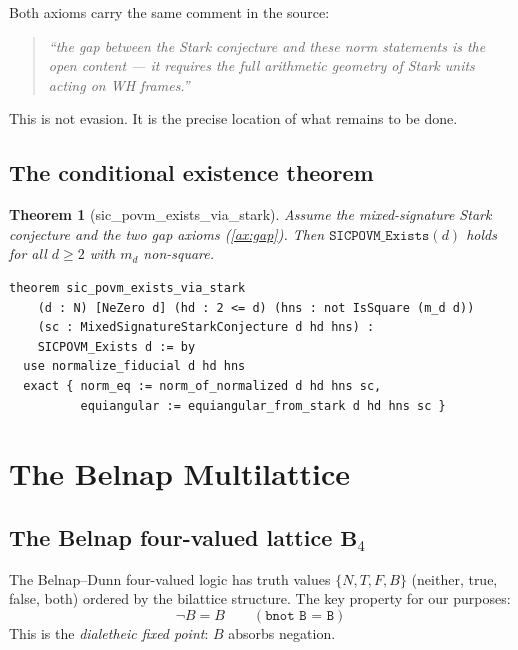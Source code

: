 \documentclass[12pt,a4paper]{article}
\newtheorem{theorem}{Theorem}[section]
\newcommand{\BFour}{\mathbf{B}_4}
\begin{document}
Both axioms carry the same comment in the source:
\begin{quotation}
\noindent\textit{``the gap between the Stark conjecture and these norm statements
is the open content --- it requires the full arithmetic geometry of Stark units
acting on WH frames.''}
\end{quotation}

This is not evasion.  It is the precise location of what remains to be done.

\subsection{The conditional existence theorem}

\begin{theorem}[sic\_povm\_exists\_via\_stark]
\label{thm:stark-sic}
Assume the mixed-signature Stark conjecture and the two gap axioms
(\ref{ax:gap}).  Then $\texttt{SICPOVM\_Exists}(d)$ holds for all $d \geq 2$
with $m_d$ non-square.
\end{theorem}

\begin{lstlisting}
theorem sic_povm_exists_via_stark
    (d : N) [NeZero d] (hd : 2 <= d) (hns : not IsSquare (m_d d))
    (sc : MixedSignatureStarkConjecture d hd hns) :
    SICPOVM_Exists d := by
  use normalize_fiducial d hd hns
  exact { norm_eq := norm_of_normalized d hd hns sc,
          equiangular := equiangular_from_stark d hd hns sc }
\end{lstlisting}

\section{The Belnap Multilattice}
\label{sec:belnap}

\subsection{The Belnap four-valued lattice $\BFour$}

The Belnap--Dunn four-valued logic \cite{Belnap1977} has truth values
$\{N, T, F, B\}$ (neither, true, false, both) ordered by the bilattice
structure.  The key property for our purposes:
\[
\neg B = B \qquad (\texttt{bnot B = B})
\]
This is the \emph{dialetheic fixed point}: $B$ absorbs negation.
\end{document}
